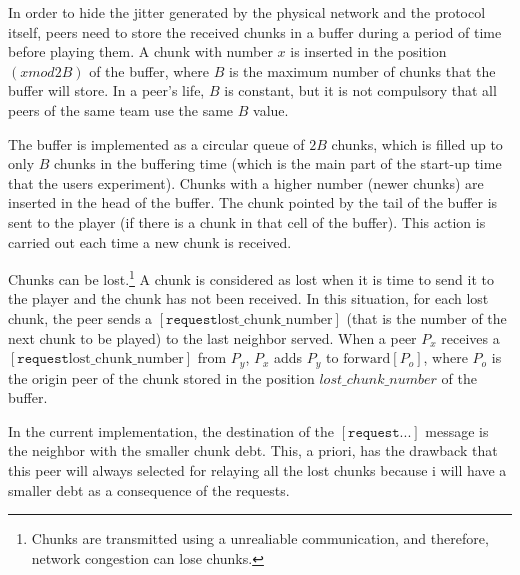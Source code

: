 
\label{sec:buffering_chunks}

In order to hide the jitter generated by the physical network and the
protocol itself, peers need to store the received chunks in a buffer
during a period of time before playing them. A chunk with number $x$
is inserted in the position $(x \mathit{mod} 2B)$ of the buffer, where
$B$ is the maximum number of chunks that the buffer will store. In a
peer's life, $B$ is constant, but it is not compulsory that all peers
of the same team use the same $B$ value.

The buffer is implemented as a circular queue of $2B$ chunks, which is
filled up to only $B$ chunks in the buffering time (which is the main
part of the start-up time that the users experiment). Chunks with a
higher number (newer chunks) are inserted in the head of the
buffer. The chunk pointed by the tail of the buffer is sent to the
player (if there is a chunk in that cell of the buffer). This action
is carried out each time a new chunk is received.

Chunks can be lost.\footnote{Chunks are transmitted using a
  unrealiable communication, and therefore, network congestion can
  lose chunks.} A chunk is considered as lost when it is time to send
it to the player and the chunk has not been received.  In this
situation, for each lost chunk, the peer sends a $[\mathtt{request}
  \text{lost\_chunk\_number}]$ (that is the number of the next chunk
to be played) to the last neighbor served. When a peer $P_x$ receives
a $[\mathtt{request} \text{lost\_chunk\_number}]$ from $P_y$, $P_x$
adds $P_y$ to $\text{forward}[P_o]$, where $P_o$ is the origin peer of
the chunk stored in the position $lost\_chunk\_number$ of the buffer.

\begin{comment}
origin peer of the next chunk stored in the
buffer. This peer has to characteristics: (1) it is not necessary a
neighbor peer, and (2) there is a high probability that this chunk has
been stored in the buffer ``for a long time'', so, if it is not a
neighbor, the link between it and the peer is working fairly well.
\end{comment}

\begin{notex}
  In the current implementation, the destination of the
  $[\mathtt{request} ...]$ message is the neighbor with the smaller
  chunk debt. This, a priori, has the drawback that this peer will
  always selected for relaying all the lost chunks because i will have
  a smaller debt as a consequence of the requests.
\end{notex}
  
